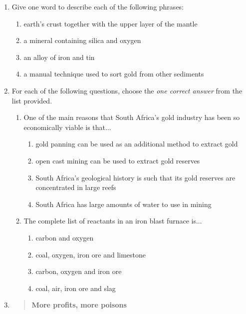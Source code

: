 \begin{eocexercises}{}
\begin{enumerate}
\item{Give one word to describe each of the following phrases:}
\begin{enumerate}
\item{earth's crust together with the upper layer of the mantle}
\item{a mineral containing silica and oxygen}
\item{an alloy of iron and tin}
\item{a manual technique used to sort gold from other sediments}
\end{enumerate}

\item{For each of the following questions, choose the \textit{one correct answer} from the list provided.}

\begin{enumerate}
\item{One of the main reasons that South Africa's gold industry has been so economically viable is that...}
\begin{enumerate}
\item{gold panning can be used as an additional method to extract gold}
\item{open cast mining can be used to extract gold reserves}
\item{South Africa's geological history is such that its gold reserves are concentrated in large reefs}
\item{South Africa has large amounts of water to use in mining}
\end{enumerate}

\item{The complete list of reactants in an iron blast furnace is...}
\begin{enumerate}
\item{carbon and oxygen}
\item{coal, oxygen, iron ore and limestone}
\item{carbon, oxygen and iron ore}
\item{coal, air, iron ore and slag}
\end{enumerate}

\end{enumerate}

\item{\begin{quote}{
\textbf{More profits, more poisons}\\

}
\end{quote}}
\end{enumerate}
\end{eocexercises}
